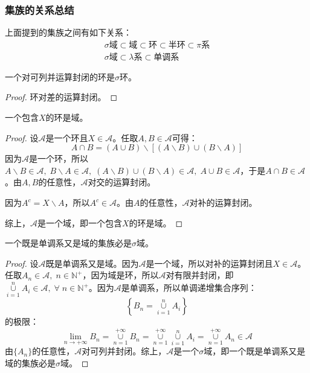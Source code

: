 \subsubsection{集族的关系总结}
上面提到的集族之间有如下关系：
\begin{gather*}
	\text{$\sigma$域}\subset\text{域}\subset\text{环}\subset\text{半环}\subset\text{$\pi$系} \\
	\text{$\sigma$域}\subset\text{$\lambda$系}\subset\text{单调系}
\end{gather*}
\begin{theorem}
	一个对可列并运算封闭的环是$\sigma$环。
\end{theorem}
\begin{proof}
	环对差的运算封闭。
\end{proof}
\begin{theorem}\label{theo:RingContainX=Field}
	一个包含$X$的环是域。
\end{theorem}
\begin{proof}
	设$\mathscr{A}$是一个环且$X\in\mathscr{A}$。任取$A,B\in\mathscr{A}$可得：
	\begin{equation*}
		A\cap B=(A\cup B)\backslash[(A\backslash B)\cup (B\backslash A)]
	\end{equation*}
	因为$\mathscr{A}$是一个环，所以$A\backslash B\in\mathscr{A},\;B\backslash A\in\mathscr{A},\;(A\backslash B)\cup(B\backslash A)\in\mathscr{A},\;A\cup B\in\mathscr{A}$，于是$A\cap B\in\mathscr{A}$。由$A,B$的任意性，$\mathscr{A}$对交的运算封闭。\par
	因为$A^c=X\backslash A$，所以$A^c\in\mathscr{A}$。由$A$的任意性，$\mathscr{A}$对补的运算封闭。\par
	综上，$\mathscr{A}$是一个域，即一个包含$X$的环是域。
\end{proof}
\begin{theorem}\label{theo:Monotone+Field=SigmaField}
	一个既是单调系又是域的集族必是$\sigma$域。
\end{theorem}
\begin{proof}
	设$\mathscr{A}$既是单调系又是域。因为$\mathscr{A}$是一个域，所以对补的运算封闭且$X\in\mathscr{A}$。任取$A_n\in\mathscr{A},\;n\in\mathbb{N}^+$，因为域是环，所以$\mathscr{A}$对有限并封闭，即$\underset{i=1}{\overset{n}{\cup}}A_i\in\mathscr{A},\;\forall\;n\in\mathbb{N}^+$。因为$\mathscr{A}$是单调系，所以单调递增集合序列：
	\begin{equation*}
		\left\{B_n=\underset{i=1}{\overset{n}{\cup}}A_i\right\}
	\end{equation*}
	的极限：
	\begin{equation*}
		\lim_{n\to+\infty}B_n=\underset{n=1}{\overset{+\infty}{\cup}}B_n=\underset{n=1}{\overset{+\infty}{\cup}}\underset{i=1}{\overset{n}{\cup}}A_i=\underset{n=1}{\overset{+\infty}{\cup}}A_n\in\mathscr{A}
	\end{equation*}
	由$\{A_n\}$的任意性，$\mathscr{A}$对可列并封闭。综上，$\mathscr{A}$是一个$\sigma$域，即一个既是单调系又是域的集族必是$\sigma$域。
\end{proof}
